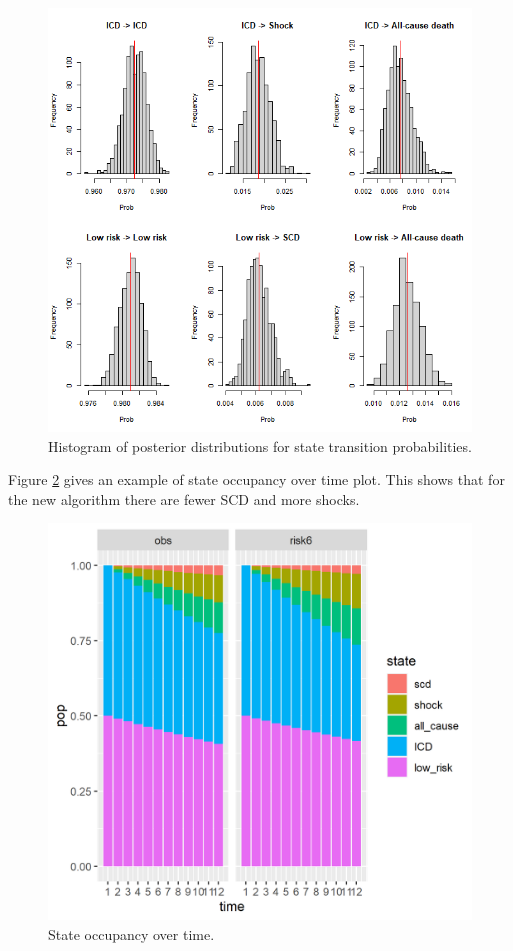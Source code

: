 \documentclass[
]{article}
\begin{document}
\begin{figure}

{\centering \includegraphics[width=0.8\linewidth]{posterior_histograms} 

}

\caption{Histogram of posterior distributions for state transition probabilities.}\label{fig:hist}
\end{figure}

Figure \ref{fig:statepop} gives an example of state occupancy over time plot.
This shows that for the new algorithm there are fewer SCD and more shocks.

\begin{figure}

{\centering \includegraphics[width=20.31in]{../../images/state_pop_over_time} 

}

\caption{State occupancy over time.}\label{fig:statepop}
\end{figure}
\end{document}
